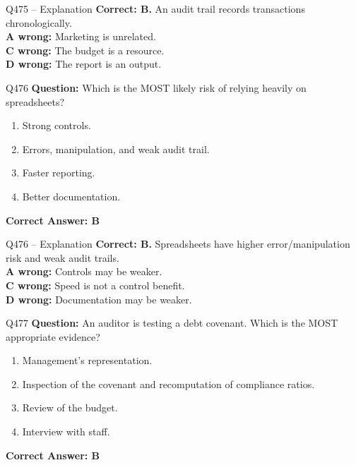 \documentclass[aspectratio=169,10pt]{beamer}
\begin{document}
	\begin{frame}[t]{Q475 -- Explanation}
		\small
		\textbf{Correct: B.} An audit trail records transactions chronologically. \\[4pt]
		\textbf{A wrong:} Marketing is unrelated. \\[2pt]
		\textbf{C wrong:} The budget is a resource. \\[2pt]
		\textbf{D wrong:} The report is an output.
	\end{frame}
	
	\begin{frame}[t]{Q476}
		\small
		\textbf{Question:} Which is the MOST likely risk of relying heavily on spreadsheets?
		\begin{enumerate}[label=\Alph*.,itemsep=1pt,topsep=2pt]
			\item Strong controls.
			\item Errors, manipulation, and weak audit trail.
			\item Faster reporting.
			\item Better documentation.
		\end{enumerate}
		\vspace{4pt}
		\textbf{Correct Answer: B}
	\end{frame}
	
	\begin{frame}[t]{Q476 -- Explanation}
		\small
		\textbf{Correct: B.} Spreadsheets have higher error/manipulation risk and weak audit trails. \\[4pt]
		\textbf{A wrong:} Controls may be weaker. \\[2pt]
		\textbf{C wrong:} Speed is not a control benefit. \\[2pt]
		\textbf{D wrong:} Documentation may be weaker.
	\end{frame}
	
	\begin{frame}[t]{Q477}
		\small
		\textbf{Question:} An auditor is testing a debt covenant. Which is the MOST appropriate evidence?
		\begin{enumerate}[label=\Alph*.,itemsep=1pt,topsep=2pt]
			\item Management's representation.
			\item Inspection of the covenant and recomputation of compliance ratios.
			\item Review of the budget.
			\item Interview with staff.
		\end{enumerate}
		\vspace{4pt}
		\textbf{Correct Answer: B}
	\end{frame}
	
\end{document}

